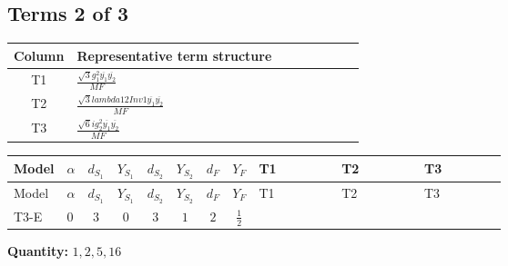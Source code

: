 \documentclass[8pt]{article}
\begin{document}
\begin{landscape}
\subsection*{Terms 2 of 3}
\begin{center}
\begin{tabular}{@{}c >{\raggedright\arraybackslash}p{0.82\linewidth}@{}}
\toprule
Column & Representative term structure \\
\midrule
T1 & \(\displaystyle \frac{\sqrt{3} g_{1}^{2} \overline{y_{1}} \overline{y_{2}}}{MF}\) \\
\midrule
T2 & \(\displaystyle \frac{\sqrt{3} lambda12Inv1 \overline{y_{1}} \overline{y_{2}}}{MF}\) \\
\midrule
T3 & \(\displaystyle \frac{\sqrt{6} i g_{2}^{2} \overline{y_{1}} \overline{y_{2}}}{MF}\) \\
\midrule
\bottomrule
\end{tabular}
\end{center}
\smallskip
\tiny
\begin{longtable}{@{}llcccccc >{\raggedright\arraybackslash}p{0.21\linewidth} >{\raggedright\arraybackslash}p{0.21\linewidth} >{\raggedright\arraybackslash}p{0.21\linewidth}@{}}
\toprule
Model & $\alpha$ & $d_{S_1}$ & $Y_{S_1}$ & $d_{S_2}$ & $Y_{S_2}$ & $d_F$ & $Y_F$ & T1 & T2 & T3 \\
\midrule
\endfirsthead
\toprule
Model & $\alpha$ & $d_{S_1}$ & $Y_{S_1}$ & $d_{S_2}$ & $Y_{S_2}$ & $d_F$ & $Y_F$ & T1 & T2 & T3 \\
\midrule
\endhead
T3-E & $0$ & $3$ & $0$ & $3$ & $1$ & $2$ & $\frac{1}{2}$ & \scriptsize\adjustbox{max width=\linewidth}{$\begin{gathered} - \frac{\sqrt{3} g_{1}^{2} \overline{y_{1}} \overline{y_{2}}}{8 MF}\end{gathered}$} & \scriptsize\adjustbox{max width=\linewidth}{$\begin{gathered} \frac{\sqrt{3} lambda12Inv1 \overline{y_{1}} \overline{y_{2}}}{6 MF}\end{gathered}$} & \scriptsize\adjustbox{max width=\linewidth}{$\begin{gathered} - \frac{\sqrt{6} i g_{2}^{2} \overline{y_{1}} \overline{y_{2}}}{6 MF}\end{gathered}$} \\
\midrule
\bottomrule
\end{longtable}
\clearpage
\noindent\textbf{Quantity: }$\mathrm{1,2,5,16}$\par\smallskip

\end{landscape}
\end{document}
